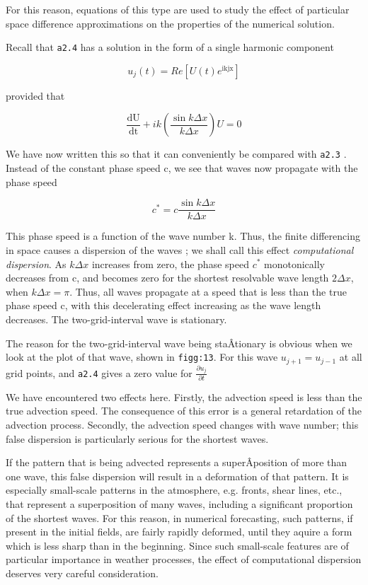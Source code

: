 For this reason, equations of this type are used to study the effect of
particular space difference approximations on the properties of the
numerical solution.

Recall that \texttt{a2.4} has a solution in the form of a single
harmonic component

{\[u_{j}\left( t \right) = Re\left\lbrack U\left( t \right)e^{\text{ikjx}} \right\rbrack\]}

provided that

{\[\frac{\text{dU}}{\text{dt}} + ik\left( \frac{\sin{k\Delta x}}{k\Delta x} \right)U = 0\]}

We have now written this so that it can conveniently be compared with
\texttt{a2.3} . Instead of the constant phase speed c, we see that waves
now propagate with the phase speed

{\[c^{*} = c\frac{\sin{k\Delta x}}{k\Delta x}\]}

This phase speed is a function of the wave number k. Thus, the finite
differencing in space causes a dispersion of the waves ; we shall call
this effect \emph{computational dispersion}. As \(k\Delta x\) increases
from zero, the phase speed \(c^{*}\) monotonically decreases from c, and
becomes zero for the shortest resolvable wave length \(2\Delta x\), when
\(k\Delta x = \pi\). Thus, all waves propagate at a speed that is less
than the true phase speed c, with this decelerating effect increasing as
the wave length decreases. The two-grid-interval wave is stationary.

The reason for the two-grid-interval wave being staÂ­tionary is obvious
when we look at the plot of that wave, shown in \texttt{figg:13}. For
this wave \(u_{j + 1} = u_{j - 1}\) at all grid points, and
\texttt{a2.4} gives a zero value for
\(\frac{{\partial u}_{j}}{\partial t}\)

We have encountered two effects here. Firstly, the advection speed is
less than the true advection speed. The consequence of this error is a
general retardation of the advection process. Secondly, the advection
speed changes with wave number; this false dispersion is particularly
serious for the shortest waves.

\begin{figure}
\centering
{}
\caption{}
\end{figure}

If the pattern that is being advected represents a superÂ­position of
more than one wave, this false dispersion will result in a deformation
of that pattern. It is especially small-scale patterns in the
atmosphere, e.g. fronts, shear lines, etc., that represent a
superposition of many waves, including a significant proportion of the
shortest waves. For this reason, in numerical forecasting, such
patterns, if present in the initial fields, are fairly rapidly deformed,
until they aquire a form which is less sharp than in the beginning.
Since such small-scale features are of particular importance in weather
processes, the effect of computational dispersion deserves very careful
consideration.

